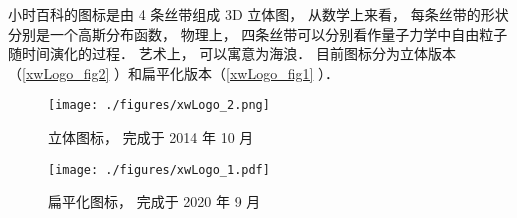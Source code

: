 
\begin{issues}
\issueDraft
{}
\end{issues}

小时百科的图标是由 4 条丝带组成 3D 立体图， 从数学上来看， 每条丝带的形状分别是一个高斯分布函数， 物理上， 四条丝带可以分别看作量子力学中自由粒子随时间演化的过程． 艺术上， 可以寓意为海浪． 目前图标分为立体版本（\autoref{xwLogo_fig2} ）和扁平化版本（\autoref{xwLogo_fig1} ）．

\begin{figure}[ht]
\centering
\texttt{[image: ./figures/xwLogo\_2.png]}
\caption{立体图标， 完成于 2014 年 10 月} \label{xwLogo_fig2}
\end{figure}

\begin{figure}[ht]
\centering
\texttt{[image: ./figures/xwLogo\_1.pdf]}
\caption{扁平化图标， 完成于 2020 年 9 月} \label{xwLogo_fig1}
\end{figure}
